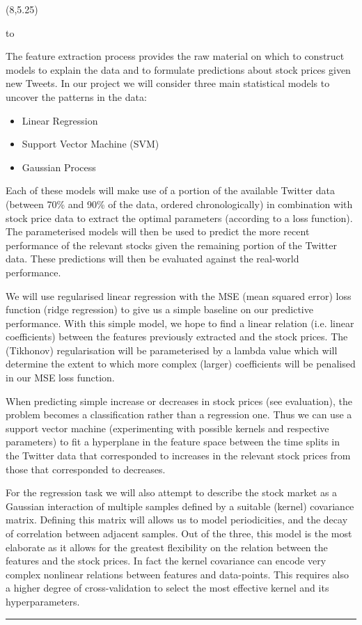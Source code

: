 \documentclass[a0]{a0poster}
\def\Head#1{\noindent\hbox to \hsize{\hfil{\LARGE\color{DarkBlue}\sf #1}}\bigskip}
\def\Subhead#1{\noindent{\large\color{DarkBlue}\sf #1}\bigskip}
\begin{document}
\begin{textblock}{7}(8,5.25)

\Head{Machine Learning}

\sf
The feature extraction process provides the raw material on which to construct models to explain the data and to formulate predictions about stock prices given new Tweets. In our project we will consider three main statistical models to uncover the patterns in the data:
\begin{itemize}
\item Linear Regression
\item Support Vector Machine (SVM)
\item Gaussian Process
\end{itemize}
Each of these models will make use of a portion of the available Twitter data (between 70\% and 90\% of the data, ordered chronologically) in combination with stock price data to extract the optimal parameters (according to a loss function). The parameterised models will then be used to predict the more recent performance of the relevant stocks given the remaining portion of the Twitter data. These predictions will then be evaluated against the real-world performance. 

\Subhead{Linear Regression}
We will use regularised linear regression with the MSE (mean squared error) loss function (ridge regression) to give us a simple baseline on our predictive performance. With this simple model, we hope to find a linear relation (i.e. linear coefficients) between the features previously extracted and the stock prices. The (Tikhonov) regularisation will be parameterised by a lambda value which will determine the extent to which more complex (larger) coefficients will be penalised in our MSE loss function.

\Subhead{SVM}
When predicting simple increase or decreases in stock prices (see evaluation), the problem becomes a classification rather than a regression one. Thus we can use a support vector machine (experimenting with possible kernels and respective parameters) to fit a hyperplane in the feature space between the time splits in the Twitter data that corresponded to increases in the relevant stock prices from those that corresponded to decreases. 

\Subhead{Gaussian Process}
For the regression task we will also attempt to describe the stock market as a Gaussian interaction of multiple samples defined by a suitable (kernel) covariance matrix. Defining this matrix will allows us to model periodicities, and the decay of correlation between adjacent samples. Out of the three, this model is the most elaborate as it allows for the greatest flexibility on the relation between the features and the stock prices. In fact the kernel covariance can encode very complex nonlinear relations between features and data-points.  This requires also a higher degree of cross-validation to select the most effective kernel and its hyperparameters.

\bigskip
\hrule
\end{textblock}
\end{document}
